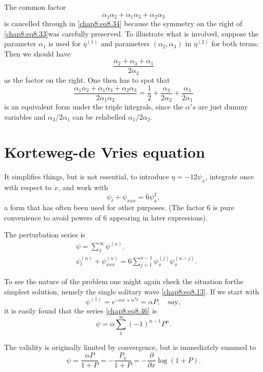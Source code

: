 The common factor
$$
\alpha_1\alpha_2+\alpha_1\alpha_3+\alpha_2\alpha_3
$$
is cancelled through in \eqref{chap8:eq8.34} because the symmetry on the right of \eqref{chap8:eq8.33}\pageoriginale was carefully preserved. To illustrate what is involved, suppose the parameter $\alpha_1$ is used for $\eta^{(1)}$ and parameters $(\alpha_2,\alpha_3)$ in $\eta^{(2)}$ for both terms. Then we should have 
$$
\frac{\alpha_2+\alpha_3+\alpha_1}{2\alpha_2}
$$
as the factor on the right. One then has to spot that 
$$
\frac{\alpha_1\alpha_2+\alpha_1\alpha_3+\alpha_2\alpha_3}{2\alpha_1\alpha_2}= \frac{1}{2}+\frac{\alpha_3}{2\alpha_2}+\frac{\alpha_3}{2\alpha_1}
$$
is an equivalent form under the triple integrals, since the $\alpha's$ are just dummy variables and $\alpha_3/2\alpha_1$ can be relabelled $\alpha_1/2\alpha_2$. 

\section{Korteweg-de Vries equation}\label{chap8:sec8.4}

It simplifies things, but is not essential, to introduce $\eta=-12\psi_x$, integrate once with respect to $x$, and work with 
\begin{equation}
\psi_t+\psi_{xxx}=6\psi_x^2,\tag{8.45}\label{chap8:eq8.45}
\end{equation}
a form that has often been used for other purposes. (The factor 6 is pure convenience to avoid powers of 6 appearing in later expressions).

The perturbation series is
\begin{align*}
& \psi=\sum\limits_1^\infty\psi^{(n)}.\\
& \psi_t^{(n)}+\psi_{xxx}^{(n)}=6\sum\limits_{j=1}^{n-1}\psi_x^{(j)}\psi_x^{(n-j)}. \tag{8.46}\label{chap8:eq8.46}
\end{align*}

To see the nature of the problem one might again check the situation for\pageoriginale the simplest solution, nemely the single solitary wave \eqref{chap8:eq8.13}. If we start with
$$
\psi^{(1)}= e^{-\alpha x+\alpha^3 t}=\alpha P,\quad\text{say},
$$
it is easily found that the series \eqref{chap8:eq8.46} is 
$$
\psi =\alpha\sum\limits_1^\infty(-1)^{n-1}P^n.
$$

The validity is originally limited by convergence, but is immediately summed to 
\begin{equation}
\psi=\frac{\alpha P}{1+P}=-\frac{P_x}{1+P}=-\frac{\partial}{\partial x}\log (1+P).\tag{8.47}\label{chap8:eq8.47}
\end{equation}

